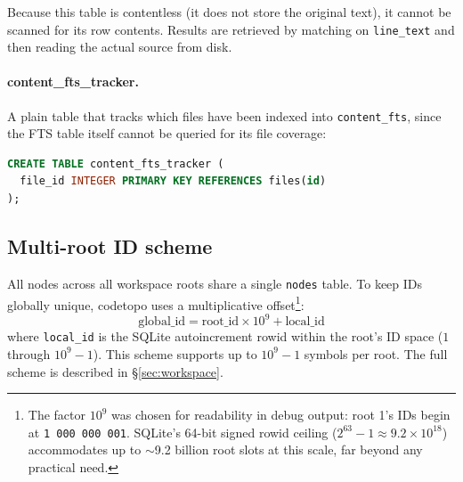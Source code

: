 Because this table is contentless (it does not store the original text),
it cannot be scanned for its row contents. Results are retrieved by matching
on \texttt{line\_text} and then reading the actual source from disk.

\paragraph{content\_fts\_tracker.}  A plain table that tracks which files
have been indexed into \texttt{content\_fts}, since the FTS table itself
cannot be queried for its file coverage:

\begin{lstlisting}[language=sql]
CREATE TABLE content_fts_tracker (
  file_id INTEGER PRIMARY KEY REFERENCES files(id)
);
\end{lstlisting}

\subsection{Multi-root ID scheme}

All nodes across all workspace roots share a single \texttt{nodes} table. To
keep IDs globally unique, codetopo uses a multiplicative offset\footnote{The
factor $10^9$ was chosen for readability in debug output: root 1's IDs begin
at \texttt{1\,000\,000\,001}. SQLite's 64-bit signed rowid ceiling
($2^{63}-1 \approx 9.2 \times 10^{18}$) accommodates up to $\sim$9.2 billion
root slots at this scale, far beyond any practical need.}:
\[
  \text{global\_id} = \text{root\_id} \times 10^9 + \text{local\_id}
\]
where \texttt{local\_id} is the SQLite autoincrement rowid within the root's
ID space ($1$ through $10^9 - 1$). This scheme supports up to $10^9 - 1$
symbols per root. The full scheme is described in \S\ref{sec:workspace}.

